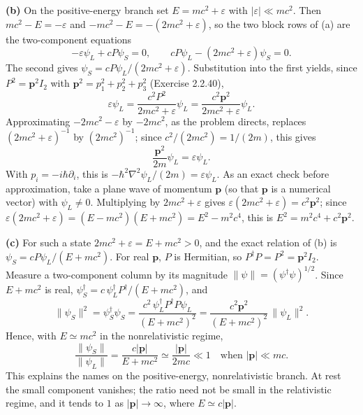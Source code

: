 \textbf{(b)} 
On the positive-energy branch set $E=mc^2+\varepsilon$
with $|\varepsilon|\ll mc^2$. Then $mc^2-E=-\varepsilon$ and
$-mc^2-E=-(2mc^2+\varepsilon)$, so the two block rows of (a) are the
two-component equations
\[
-\varepsilon\psi_L+cP\psi_S=0,\qquad
cP\psi_L-(2mc^2+\varepsilon)\psi_S=0.
\]
The second gives $\psi_S=cP\psi_L/(2mc^2+\varepsilon)$.
Substitution into the first yields, since $P^2=\mathbf p^2I_2$ with
$\mathbf p^2=p_1^2+p_2^2+p_3^2$ (Exercise 2.2.40),
\[
\varepsilon\psi_L=\frac{c^2P^2}{2mc^2+\varepsilon}\psi_L
=\frac{c^2\mathbf p^2}{2mc^2+\varepsilon}\psi_L.
\]
Approximating $-2mc^2-\varepsilon$ by $-2mc^2$, as the problem
directs, replaces $(2mc^2+\varepsilon)^{-1}$ by $(2mc^2)^{-1}$; since
$c^2/(2mc^2)=1/(2m)$, this gives
\[
\boxed{\frac{\mathbf p^2}{2m}\psi_L=\varepsilon\psi_L}.
\]
With $p_i=-i\hbar\partial_i$, this is
$-\hbar^2\nabla^2\psi_L/(2m)=\varepsilon\psi_L$.
As an exact check before approximation, take a plane wave of
momentum $\mathbf p$ (so that $\mathbf p$ is a numerical vector)
with $\psi_L\ne0$. Multiplying by $2mc^2+\varepsilon$ gives
$\varepsilon(2mc^2+\varepsilon)=c^2\mathbf p^2$; since
$\varepsilon(2mc^2+\varepsilon)=(E-mc^2)(E+mc^2)=E^2-m^2c^4$, this is
$E^2=m^2c^4+c^2\mathbf p^2$.

\textbf{(c)} For such a state $2mc^2+\varepsilon=E+mc^2>0$, and the
exact relation of (b) is $\psi_S=cP\psi_L/(E+mc^2)$. For real
$\mathbf p$, $P$ is Hermitian, so $P^\dagger P=P^2=\mathbf p^2I_2$.
Measure a two-component column by its magnitude
$\|\psi\|=(\psi^\dagger\psi)^{1/2}$. Since $E+mc^2$ is real,
$\psi_S^\dagger=c\,\psi_L^\dagger P^\dagger/(E+mc^2)$, and
\[
\|\psi_S\|^2=\psi_S^\dagger\psi_S
=\frac{c^2\,\psi_L^\dagger P^\dagger P\psi_L}{(E+mc^2)^2}
=\frac{c^2\mathbf p^2}{(E+mc^2)^2}\,\|\psi_L\|^2.
\]
Hence, with $E\simeq mc^2$ in the nonrelativistic regime,
\[
\frac{\|\psi_S\|}{\|\psi_L\|}
=\frac{c|\mathbf p|}{E+mc^2}
\simeq\frac{|\mathbf p|}{2mc}\ll1
\quad\text{when }|\mathbf p|\ll mc.
\]
This explains the names on the positive-energy, nonrelativistic
branch. At rest the small component vanishes; the ratio need not be
small in the relativistic regime, and it tends to $1$ as
$|\mathbf p|\to\infty$, where $E\simeq c|\mathbf p|$.

